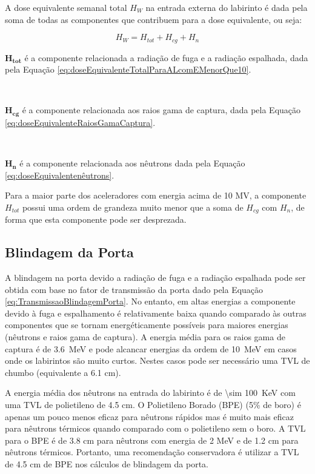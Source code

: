 \documentclass[11pt,a4paper]{article}
\newcounter{exemplo}
\begin{document}
        A dose equivalente semanal total $H_W$ na entrada externa do labirinto é dada pela soma de todas as componentes que contribuem para a dose equivalente, ou seja:

        \begin{equation}
            H_W = H_{tot} + H_{cg} + H_{n}
        \end{equation}

        \begin{exemplo}[onde:]
            \textcolor{CarnationPink}{$\mathbf{H_{tot}}$} é a componente relacionada a radiação de fuga e a radiação espalhada, dada pela Equação \ref{eq:doseEquivalenteTotalParaALcomEMenorQue10}.

            \

            \textcolor{CarnationPink}{$\mathbf{H_{cg}}$} é a componente relacionada aos raios gama de captura, dada pela Equação \ref{eq:doseEquivalenteRaiosGamaCaptura}.

            \

            \textcolor{CarnationPink}{$\mathbf{H_n}$} é a componente relacionada aos nêutrons dada pela Equação \ref{eq:doseEquivalentenêutrons}.
        \end{exemplo}

        Para a maior parte dos aceleradores com energia acima de 10 MV, a componente $H_{tot}$ possui uma ordem de grandeza muito menor que a soma de $H_{cg}$ com $H_n$, de forma que esta componente pode ser desprezada.

    \subsection{Blindagem da Porta}

        A blindagem na porta devido a radiação de fuga e a radiação espalhada pode ser obtida com base no fator de transmissão da porta dado pela Equação \ref{eq:TransmissaoBlindagemPorta}. No entanto, em altas energias a componente devido à fuga e espalhamento é relativamente baixa quando comparado às outras componentes que se tornam energéticamente possíveis para maiores energias (nêutrons e raios gama de captura). A energia média para os raios gama de captura é de \qty{3.6}{MeV} e pode alcancar energias da ordem de \qty{10}{MeV} em casos onde os labirintos são muito curtos. Nestes casos pode ser necessário uma TVL de chumbo (equivalente a 6.1 cm). 

        A energia média dos nêutrons na entrada do labirinto é de \qty{\sim 100}{KeV} com uma TVL de polietileno de 4.5 cm. O Polietileno Borado (BPE) (5\% de boro) é apenas um pouco menos eficaz para nêutrons rápidos mas é muito mais eficaz para nêutrons térmicos quando comparado com o polietileno sem o boro.  A TVL para o BPE é de 3.8 cm para nêutrons com energia de 2 MeV e de 1.2 cm para nêutrons térmicos. Portanto, uma recomendação conservadora é utilizar a TVL de 4.5 cm de BPE nos cálculos de blindagem da porta.
\end{document}
